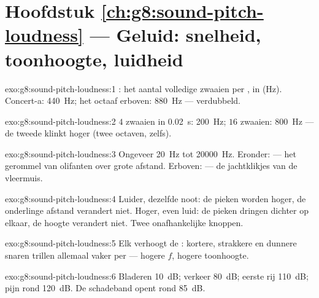 \section*{Hoofdstuk \ref{ch:g8:sound-pitch-loudness} --- Geluid: snelheid, toonhoogte, luidheid}

\begin{solution}{exo:g8:sound-pitch-loudness:1}
: het aantal volledige zwaaien per , in
 (\unit{Hz}). Concert-a: \qty{440}{Hz}; het octaaf
erboven: \qty{880}{Hz} --- verdubbeld.
\end{solution}

\begin{solution}{exo:g8:sound-pitch-loudness:2}
$4$ zwaaien in \qty{0.02}{s}: \qty{200}{Hz}; $16$ zwaaien:
\qty{800}{Hz} --- de tweede klinkt hoger (twee octaven,
zelfs).
\end{solution}

\begin{solution}{exo:g8:sound-pitch-loudness:3}
Ongeveer \qty{20}{Hz} tot \qty{20000}{Hz}. Eronder:
 --- het gerommel van olifanten over grote afstand.
Erboven:  --- de jachtklikjes van de vleermuis.
\end{solution}

\begin{solution}{exo:g8:sound-pitch-loudness:4}
Luider, dezelfde noot: de pieken worden hoger, de onderlinge afstand
verandert niet. Hoger, even luid: de pieken dringen dichter op elkaar,
de hoogte verandert niet. Twee onafhankelijke knoppen.
\end{solution}

\begin{solution}{exo:g8:sound-pitch-loudness:5}
Elk verhoogt de : kortere, strakkere en dunnere
snaren trillen allemaal vaker per  --- hogere $f$, hogere
toonhoogte.
\end{solution}

\begin{solution}{exo:g8:sound-pitch-loudness:6}
Bladeren \qty{10}{dB}; verkeer \qty{80}{dB}; eerste rij \qty{110}{dB};
pijn rond \qty{120}{dB}. De schadeband opent rond \qty{85}{dB}.
\end{solution}

